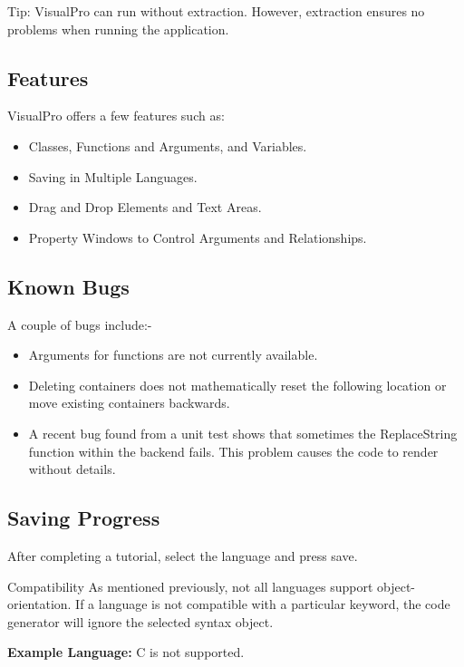 \documentclass[10pt]{article}
\begin{document}
        \begin{tip}{Tip:}
            VisualPro can run without extraction. However, extraction ensures no problems when running the application.
        \end{tip}
    \subsection{Features}
        VisualPro offers a few features such as:
        \begin{itemize}
            \item Classes, Functions and Arguments, and Variables.
            \item Saving in Multiple Languages.
            \item Drag and Drop Elements and Text Areas.
            \item Property Windows to Control Arguments and Relationships.
        \end{itemize}

    \subsection{Known Bugs}
    \label{subsec:ve-knownbugs}
        A couple of bugs include:-
        \begin{itemize}
            \item Arguments for functions are not currently available.
            \item Deleting containers does not mathematically reset the following location or move existing containers backwards.
            \item A recent bug found from a unit test shows that sometimes the ReplaceString function within the backend fails. This problem causes the code to render without details.
        \end{itemize}

    \subsection{Saving Progress}
        After completing a tutorial, select the language and press save.

        \begin{tip}{Compatibility}
            As mentioned previously, not all languages support object-orientation. If a language is not compatible with a particular keyword, the code generator will ignore the selected syntax object.

            \textbf{Example Language:} C is not supported.
        \end{tip}
\end{document}
